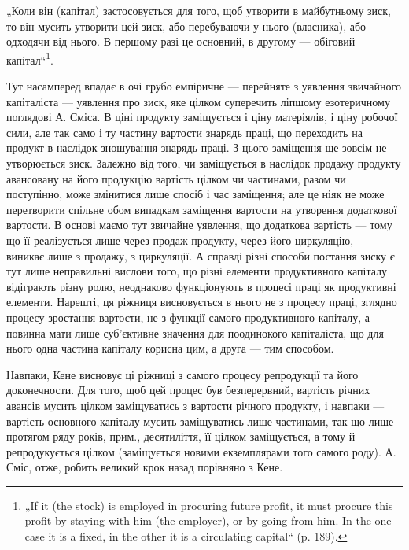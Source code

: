 „Коли він (капітал) застосовується для того, щоб утворити в майбутньому
зиск, то він мусить утворити цей зиск, або перебуваючи у
нього (власника), або одходячи від нього. В першому разі це основний,
в другому — обіговий капітал“\footnote*{
„If it (the stock) is employed in procuring future profit, it must procure this
profit by staying with him (the employer), or by going from him. In the one case
it is a fixed, in the other it is a circulating capital“ (p. 189).
}.

Тут насамперед впадає в очі грубо емпіричне — перейняте з уявлення
звичайного капіталіста — уявлення про зиск, яке цілком суперечить ліпшому
езотеричному поглядові А. Сміса. В ціні продукту заміщується і ціну
матеріялів, і ціну робочої сили, але так само і ту частину вартости знарядь
праці, що переходить на продукт в наслідок зношування знарядь
праці. З цього заміщення ще зовсім не утворюється зиск. Залежно від
того, чи заміщується в наслідок продажу продукту авансовану на його
продукцію вартість цілком чи частинами, разом чи поступінно, може змінитися
лише спосіб і час заміщення; але це ніяк не може перетворити
спільне обом випадкам заміщення вартости на утворення додаткової вартости.
В основі маємо тут звичайне уявлення, що додаткова вартість —
тому що її реалізується лише через продаж продукту, через його циркуляцію,
— виникає лише з продажу, з циркуляції. А справді різні
способи постання зиску є тут лише неправильні вислови того, що різні
елементи продуктивного капіталу відіграють різну ролю, неоднаково
функціонують в процесі праці як продуктивні елементи. Нарешті, ця
ріжниця висновується в нього не з процесу праці, зглядно процесу зростання
вартости, не з функції самого продуктивного капіталу, а повинна
мати лише суб’єктивне значення для поодинокого капіталіста, що для
нього одна частина капіталу корисна цим, а друга — тим способом.

Навпаки, Кене висновує ці ріжниці з самого процесу репродукції
та його доконечности. Для того, щоб цей процес був безперервний,
вартість річних авансів мусить цілком заміщуватись з вартости річного
продукту, і навпаки — вартість основного капіталу мусить заміщуватись
лише частинами, так що лише протягом ряду років, прим., десятиліття,
її цілком заміщується, а тому й репродукується цілком (заміщується новими
екземплярами того самого роду). А. Сміс, отже, робить великий
крок назад порівняно з Кене.

